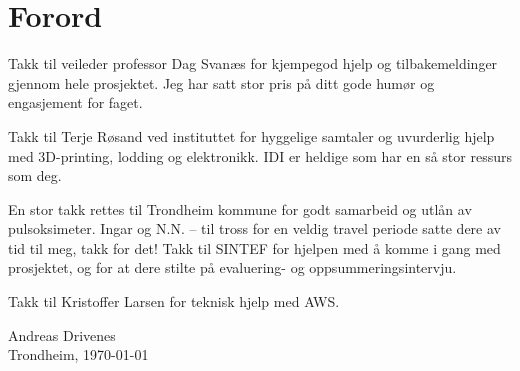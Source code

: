 \chapter*{Forord}
Takk til veileder professor Dag Svanæs for kjempegod hjelp og tilbakemeldinger gjennom hele prosjektet.
Jeg har satt stor pris på ditt gode humør og engasjement for faget.

Takk til Terje Røsand ved instituttet for hyggelige samtaler og uvurderlig hjelp med 3D-printing, lodding og elektronikk.
IDI er heldige som har en så stor ressurs som deg.

En stor takk rettes til Trondheim kommune for godt samarbeid og utlån av pulsoksimeter.
Ingar og N.N. -- til tross for en veldig travel periode satte dere av tid til meg, takk for det!
Takk til SINTEF for hjelpen med å komme i gang med prosjektet, og for at dere
stilte på evaluering- og oppsummeringsintervju.

Takk til Kristoffer Larsen for teknisk hjelp med AWS.

\begin{flushright}
Andreas Drivenes\\[0.8pc]
Trondheim, \today
\end{flushright}
